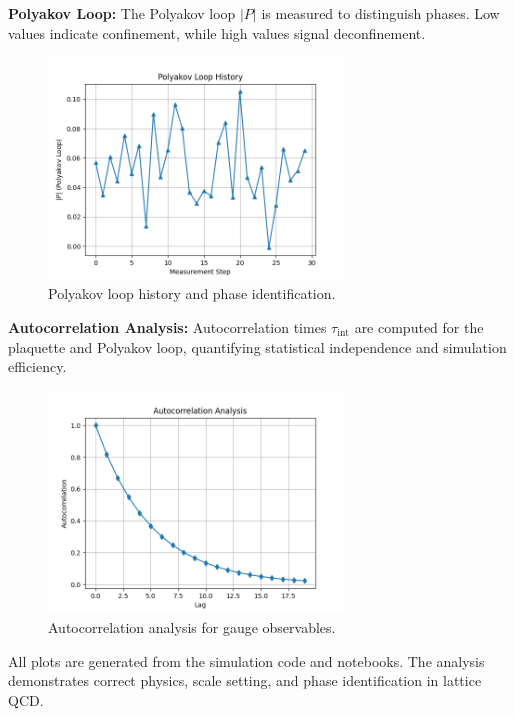 \documentclass[12pt]{article}
\begin{document}
\textbf{Polyakov Loop:}
The Polyakov loop $|P|$ is measured to distinguish phases. Low values indicate confinement, while high values signal deconfinement.

\begin{figure}[h]
    \centering
    \includegraphics[width=0.7\textwidth]{../plots/gauge_theory/polyakov_loop_history.png}
    \caption{Polyakov loop history and phase identification.}
\end{figure}

\textbf{Autocorrelation Analysis:}
Autocorrelation times $\tau_{\text{int}}$ are computed for the plaquette and Polyakov loop, quantifying statistical independence and simulation efficiency.

\begin{figure}[h]
    \centering
    \includegraphics[width=0.7\textwidth]{../plots/gauge_theory/autocorrelation_analysis.png}
    \caption{Autocorrelation analysis for gauge observables.}
\end{figure}

All plots are generated from the simulation code and notebooks. The analysis demonstrates correct physics, scale setting, and phase identification in lattice QCD.
\end{document}

